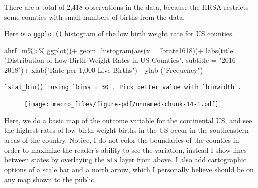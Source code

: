 \documentclass[
  letterpaper,
  DIV=11,
  numbers=noendperiod]{scrreprt}
\newenvironment{Shaded}{\begin{snugshade}}{\end{snugshade}}
\newcommand{\AttributeTok}[1]{\textcolor[rgb]{0.40,0.45,0.13}{#1}}
\newcommand{\FunctionTok}[1]{\textcolor[rgb]{0.28,0.35,0.67}{#1}}
\newcommand{\NormalTok}[1]{\textcolor[rgb]{0.00,0.23,0.31}{#1}}
\newcommand{\SpecialCharTok}[1]{\textcolor[rgb]{0.37,0.37,0.37}{#1}}
\newcommand{\StringTok}[1]{\textcolor[rgb]{0.13,0.47,0.30}{#1}}
\begin{document}
There are a total of 2,418 observations in the data, because the HRSA
restricts some counties with small numbers of births from the data.

Here is a \texttt{ggplot()} histogram of the low birth weight rate for
US counties.

\begin{Shaded}
\begin{Highlighting}[]
\NormalTok{ahrf\_m}\SpecialCharTok{\%\textgreater{}\%}
  \FunctionTok{ggplot}\NormalTok{()}\SpecialCharTok{+}
  \FunctionTok{geom\_histogram}\NormalTok{(}\FunctionTok{aes}\NormalTok{(}\AttributeTok{x =}\NormalTok{ lbrate1618))}\SpecialCharTok{+}
  \FunctionTok{labs}\NormalTok{(}\AttributeTok{title =} \StringTok{"Distribution of Low Birth Weight Rates in US Counties"}\NormalTok{,}
       \AttributeTok{subtitle =} \StringTok{"2016 {-} 2018"}\NormalTok{)}\SpecialCharTok{+}
       \FunctionTok{xlab}\NormalTok{(}\StringTok{"Rate per 1,000 Live Births"}\NormalTok{)}\SpecialCharTok{+}
  \FunctionTok{ylab}\NormalTok{ (}\StringTok{"Frequency"}\NormalTok{)}
\end{Highlighting}
\end{Shaded}

\begin{verbatim}
`stat_bin()` using `bins = 30`. Pick better value with `binwidth`.
\end{verbatim}

\begin{figure}[H]

{\centering \texttt{[image: macro\_files/figure-pdf/unnamed-chunk-14-1.pdf]}

}

\end{figure}

Here, we do a basic map of the outcome variable for the continental US,
and see the highest rates of low birth weight births in the US occur in
the southeastern areas of the country. Notice, I do not color the
boundaries of the counties in order to maximize the reader's ability to
see the variation, instead I show lines between states by overlaying the
\texttt{sts} layer from above. I also add cartographic options of a
scale bar and a north arrow, which I personally believe should be on any
map shown to the public.
\end{document}
